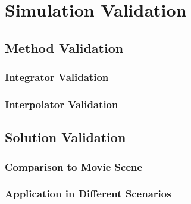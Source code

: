 \chapter{Simulation Validation}

\section{Method Validation}
\subsection{Integrator Validation}

\subsection{Interpolator Validation}

\section{Solution Validation}
\subsection{Comparison to Movie Scene}

\subsection{Application in Different Scenarios}


